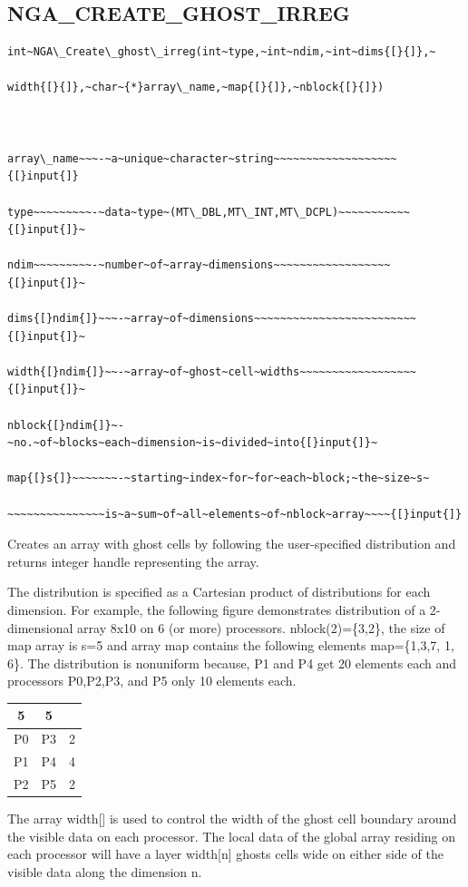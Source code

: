 \subsection*{\label{sub:NGA_CREATE_GHOST_IRREG}NGA\_CREATE\_GHOST\_IRREG}
\begin{verbatim}
int~NGA\_Create\_ghost\_irreg(int~type,~int~ndim,~int~dims{[}{]},~

width{[}{]},~char~{*}array\_name,~map{[}{]},~nblock{[}{]})



array\_name~~~-~a~unique~character~string~~~~~~~~~~~~~~~~~~~{[}input{]}

type~~~~~~~~~-~data~type~(MT\_DBL,MT\_INT,MT\_DCPL)~~~~~~~~~~~{[}input{]}~

ndim~~~~~~~~~-~number~of~array~dimensions~~~~~~~~~~~~~~~~~~{[}input{]}~

dims{[}ndim{]}~~~-~array~of~dimensions~~~~~~~~~~~~~~~~~~~~~~~~~{[}input{]}~

width{[}ndim{]}~~-~array~of~ghost~cell~widths~~~~~~~~~~~~~~~~~~{[}input{]}~

nblock{[}ndim{]}~-~no.~of~blocks~each~dimension~is~divided~into{[}input{]}~

map{[}s{]}~~~~~~~-~starting~index~for~for~each~block;~the~size~s~

~~~~~~~~~~~~~~~is~a~sum~of~all~elements~of~nblock~array~~~~{[}input{]}
\end{verbatim}
Creates an array with ghost cells by following the user-specified
distribution and returns integer handle representing the array.

The distribution is specified as a Cartesian product of distributions
for each dimension. For example, the following figure demonstrates
distribution of a 2-dimensional array 8x10 on 6 (or more) processors.
nblock(2)=\{3,2\}, the size of map array is s=5 and array map contains
the following elements map=\{1,3,7, 1, 6\}. The distribution is nonuniform
because, P1 and P4 get 20 elements each and processors P0,P2,P3, and
P5 only 10 elements each. 

\begin{tabular}{|c|c|c|}
\cline{1-2} 
5 & 5 & \multicolumn{1}{c}{}\tabularnewline
\hline 
P0 & P3 & 2\tabularnewline
\hline 
P1 & P4 & 4\tabularnewline
\hline 
P2 & P5 & 2\tabularnewline
\hline
\end{tabular} 

The array width{[}{]} is used to control the width of the ghost cell
boundary around the visible data on each processor. The local data
of the global array residing on each processor will have a layer width{[}n{]}
ghosts cells wide on either side of the visible data along the dimension
n.

